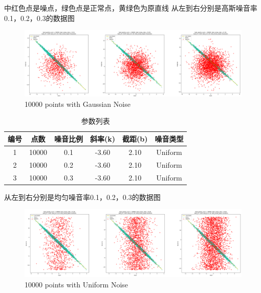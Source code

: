 \documentclass{seuer}
\begin{document}
中红色点是噪点，绿色点是正常点，黄绿色为原直线
从左到右分别是高斯噪音率0.1，0.2，0.3的数据图
\begin{figure}[H]
  \centering
  \includegraphics[scale=0.11]{./image/gen_data_Gaussian.png}
  \caption{10000 points with Gaussian Noise} \label{fig:eg}
\end{figure}
\begin{table}[h]
  \centering
  \captionnamefont{\wuhao\bf\heiti}
  \captiontitlefont{\wuhao\bf\heiti}
  \caption{参数列表} \label{tab:eg1}
  \liuhao
  \begin{tabular}{cccccc}
  \toprule
  {编号} &  {点数} & {噪音比例} & {斜率(k)} & {截距(b)} & {噪音类型}\\
  \midrule 
  1 & 10000 & 0.1 & -3.60 & 2.10 & Uniform  \\
  2 & 10000 & 0.2 & -3.60 & 2.10 & Uniform  \\
  3 & 10000 & 0.3 & -3.60 & 2.10 & Uniform  \\
  \bottomrule
  \end{tabular}
\end{table}

从左到右分别是均匀噪音率0.1，0.2，0.3的数据图
\begin{figure}[H]
  \centering
  \includegraphics[scale=0.11]{./image/gen_data_Uniform.png}
  \caption{10000 points with Uniform Noise} \label{fig:eg}
\end{figure}
\end{document}
